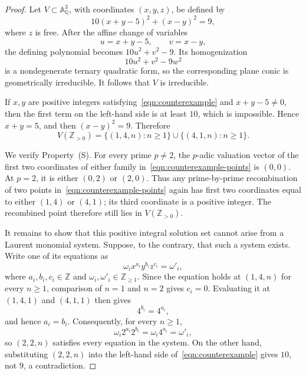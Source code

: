 \documentclass[12pt,reqno]{amsart}
\numberwithin{equation}{section}
\theoremstyle{plain}
\theoremstyle{definition}
\theoremstyle{remark}
\begin{document}
\begin{proof}
Let \(V\subset \mathbb{A}^{3}_{\mathbb{Q}}\), with coordinates \((x,y,z)\), be defined by
\begin{equation}\label{eqn:counterexample}
10(x+y-5)^2+(x-y)^2=9,
\end{equation}
where \(z\) is free. After the affine change of variables
\[
u=x+y-5,\qquad v=x-y,
\]
the defining polynomial becomes \(10u^2+v^2-9\). Its homogenization
\[
10u^2+v^2-9w^2
\]
is a nondegenerate ternary quadratic form, so the corresponding plane conic is geometrically irreducible. It follows that \(V\) is irreducible.

If \(x,y\) are positive integers satisfying~\eqref{eqn:counterexample} and \(x+y-5\neq 0\), then the first term on the left-hand side is at least \(10\), which is impossible. Hence \(x+y=5\), and then \((x-y)^2=9\). Therefore
\begin{equation}\label{eqn:counterexample-points}
V(\mathbb{Z}_{>0})
=\{(1,4,n):n\geq 1\}\mathbin{\cup}\{(4,1,n):n\geq 1\}.
\end{equation}

We verify Property~(S). For every prime \(p\neq 2\), the \(p\)-adic valuation vector of the first two coordinates of either family in~\eqref{eqn:counterexample-points} is \((0,0)\). At \(p=2\), it is either \((0,2)\) or \((2,0)\). Thus any prime-by-prime recombination of two points in~\eqref{eqn:counterexample-points} again has first two coordinates equal to either \((1,4)\) or \((4,1)\); its third coordinate is a positive integer. The recombined point therefore still lies in \(V(\mathbb{Z}_{>0})\).

It remains to show that this positive integral solution set cannot arise from a Laurent monomial system. Suppose, to the contrary, that such a system exists. Write one of its equations as
\[
\omega_i x^{a_i}y^{b_i}z^{c_i}=\omega'_i,
\]
where \(a_i,b_i,c_i\in\mathbb{Z}\) and \(\omega_i,\omega'_i\in\mathbb{Z}_{\geq 1}\). Since the equation holds at \((1,4,n)\) for every \(n\geq 1\), comparison of \(n=1\) and \(n=2\) gives \(c_i=0\). Evaluating it at \((1,4,1)\) and \((4,1,1)\) then gives
\[
4^{b_i}=4^{a_i},
\]
and hence \(a_i=b_i\). Consequently, for every \(n\geq 1\),
\[
\omega_i 2^{a_i}2^{b_i}
=\omega_i4^{a_i}
=\omega'_i,
\]
so \((2,2,n)\) satisfies every equation in the system. On the other hand, substituting \((2,2,n)\) into the left-hand side of~\eqref{eqn:counterexample} gives \(10\), not \(9\), a contradiction.
\end{proof}
\end{document}
